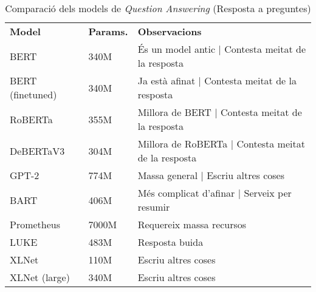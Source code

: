 \begin{table}[H]
  \centering
  \begin{tabular}{|>{\centering}m{2.3cm}|>{\centering}m{1.6cm}|m{10.7cm}|}
    \hline
    \multicolumn{3}{|c|}{\textbf{Models de \textit{Question Answering}}} \\
    \hline
    \textbf{Model} & \textbf{Params.} & \textbf{Observacions} \\
    \hline
    BERT & 340M & És un model antic | Contesta meitat de la resposta \\
    BERT (finetuned) & 340M & Ja està afinat | Contesta meitat de la resposta \\
    RoBERTa & 355M & Millora de BERT | Contesta meitat de la resposta \\
    DeBERTaV3 & 304M & Millora de RoBERTa | Contesta meitat de la resposta \\
    GPT-2 & 774M & Massa general | Escriu altres coses \\
    BART & 406M & Més complicat d'afinar | Serveix per resumir \\
    Prometheus & 7000M & Requereix massa recursos \\
    LUKE & 483M & Resposta buida \\
    XLNet & 110M & Escriu altres coses \\
    XLNet (large) & 340M & Escriu altres coses \\
    \hline
  \end{tabular}
  \caption{Comparació dels models de \textit{Question Answering} (Resposta a preguntes)}
  \label{tab:qa-comparison}
\end{table}

